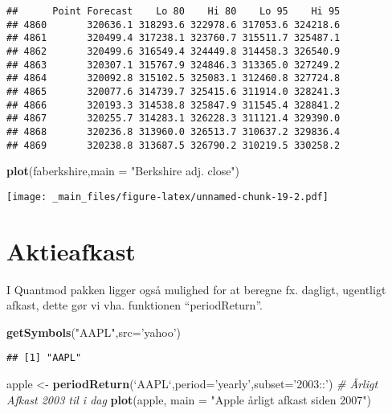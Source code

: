 \documentclass[]{book}
\newenvironment{Shaded}{\begin{snugshade}}{\end{snugshade}}
\newcommand{\CommentTok}[1]{\textcolor[rgb]{0.56,0.35,0.01}{\textit{#1}}}
\newcommand{\DataTypeTok}[1]{\textcolor[rgb]{0.13,0.29,0.53}{#1}}
\newcommand{\KeywordTok}[1]{\textcolor[rgb]{0.13,0.29,0.53}{\textbf{#1}}}
\newcommand{\NormalTok}[1]{#1}
\newcommand{\StringTok}[1]{\textcolor[rgb]{0.31,0.60,0.02}{#1}}
\begin{document}
\begin{verbatim}
##      Point Forecast    Lo 80    Hi 80    Lo 95    Hi 95
## 4860       320636.1 318293.6 322978.6 317053.6 324218.6
## 4861       320499.4 317238.1 323760.7 315511.7 325487.1
## 4862       320499.6 316549.4 324449.8 314458.3 326540.9
## 4863       320307.1 315767.9 324846.3 313365.0 327249.2
## 4864       320092.8 315102.5 325083.1 312460.8 327724.8
## 4865       320077.6 314739.7 325415.6 311914.0 328241.3
## 4866       320193.3 314538.8 325847.9 311545.4 328841.2
## 4867       320255.7 314283.1 326228.3 311121.4 329390.0
## 4868       320236.8 313960.0 326513.7 310637.2 329836.4
## 4869       320238.8 313687.5 326790.2 310219.5 330258.2
\end{verbatim}

\begin{Shaded}
\begin{Highlighting}[]
\KeywordTok{plot}\NormalTok{(faberkshire,}\DataTypeTok{main =} \StringTok{"Berkshire adj. close"}\NormalTok{)}
\end{Highlighting}
\end{Shaded}

\texttt{[image: \_main\_files/figure-latex/unnamed-chunk-19-2.pdf]}

\hypertarget{aktieafkast}{%
\section{Aktieafkast}\label{aktieafkast}}

I Quantmod pakken ligger også mulighed for at beregne fx. dagligt, ugentligt afkast, dette gør vi vha. funktionen ``periodReturn''.

\begin{Shaded}
\begin{Highlighting}[]
\KeywordTok{getSymbols}\NormalTok{(}\StringTok{"AAPL"}\NormalTok{,}\DataTypeTok{src=}\StringTok{'yahoo'}\NormalTok{)}
\end{Highlighting}
\end{Shaded}

\begin{verbatim}
## [1] "AAPL"
\end{verbatim}

\begin{Shaded}
\begin{Highlighting}[]
\NormalTok{apple <-}\StringTok{ }\KeywordTok{periodReturn}\NormalTok{(}\StringTok{`}\DataTypeTok{AAPL}\StringTok{`}\NormalTok{,}\DataTypeTok{period=}\StringTok{'yearly'}\NormalTok{,}\DataTypeTok{subset=}\StringTok{'2003::'}\NormalTok{)  }\CommentTok{# Årligt Afkast 2003 til i dag}
\KeywordTok{plot}\NormalTok{(apple, }\DataTypeTok{main =} \StringTok{"Apple årligt afkast siden 2007"}\NormalTok{)}
\end{Highlighting}
\end{Shaded}
\end{document}
